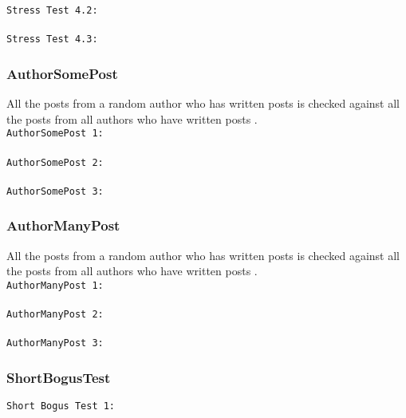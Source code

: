 \texttt{Stress Test 4.2:}\\
\\

\texttt{Stress Test 4.3:}\\


\subsubsection{AuthorSomePost}
All the posts from a random author who has written  posts is checked against all the posts from all authors who have written  posts .\\  
\texttt{AuthorSomePost 1:}\\
\\

\texttt{AuthorSomePost 2:}\\
\\

\texttt{AuthorSomePost 3:}\\


\subsubsection{AuthorManyPost}
All the posts from a random author who has written  posts is checked against all the posts from all authors who have written  posts .\\  

\texttt{AuthorManyPost 1:}\\
\\

\texttt{AuthorManyPost 2:}\\
\\

\texttt{AuthorManyPost 3:}\\


\subsubsection{ShortBogusTest}
\texttt{Short Bogus Test 1:}\\
\\

